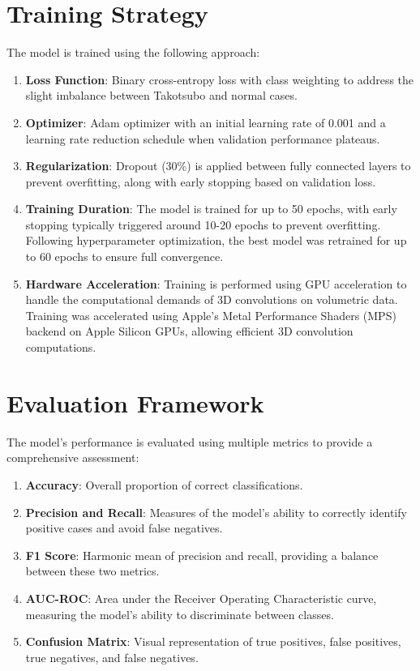 \documentclass[12pt, BSc]{muthesis}
\begin{document}
\section{Training Strategy}
The model is trained using the following approach:
\begin{enumerate}
    \item \textbf{Loss Function}: Binary cross-entropy loss with class weighting to address the slight imbalance between Takotsubo and normal cases.
    \item \textbf{Optimizer}: Adam optimizer with an initial learning rate of 0.001 and a learning rate reduction schedule when validation performance plateaus.
    \item \textbf{Regularization}: Dropout (30\%) is applied between fully connected layers to prevent overfitting, along with early stopping based on validation loss.
    \item \textbf{Training Duration}: The model is trained for up to 50 epochs, with early stopping typically triggered around 10-20 epochs to prevent overfitting. Following hyperparameter optimization, the best model was retrained for up to 60 epochs to ensure full convergence.
    \item \textbf{Hardware Acceleration}: Training is performed using GPU acceleration to handle the computational demands of 3D convolutions on volumetric data. Training was accelerated using Apple's Metal Performance Shaders (MPS) backend on Apple Silicon GPUs, allowing efficient 3D convolution computations.

\end{enumerate}

\section{Evaluation Framework}
The model's performance is evaluated using multiple metrics to provide a comprehensive assessment:
\begin{enumerate}
    \item \textbf{Accuracy}: Overall proportion of correct classifications.
    \item \textbf{Precision and Recall}: Measures of the model's ability to correctly identify positive cases and avoid false negatives.
    \item \textbf{F1 Score}: Harmonic mean of precision and recall, providing a balance between these two metrics.
    \item \textbf{AUC-ROC}: Area under the Receiver Operating Characteristic curve, measuring the model's ability to discriminate between classes.
    \item \textbf{Confusion Matrix}: Visual representation of true positives, false positives, true negatives, and false negatives. 
\end{enumerate}
\end{document}
